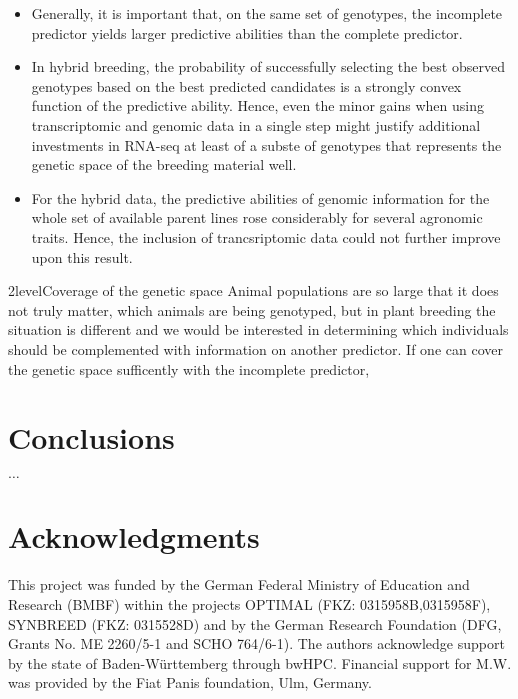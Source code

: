 \documentclass[12pt,titlepage]{article}
\begin{document}
\begin{itemize}
  \item Generally, it is important that, on the same set of genotypes, the 
    incomplete predictor yields larger predictive abilities than the complete 
    predictor.
  \item In hybrid breeding, the probability of successfully selecting the best
    observed genotypes based on the best predicted candidates is a strongly 
    convex function of the predictive ability.
    Hence, even the minor gains when using transcriptomic and genomic data in a
    single step might justify additional investments in RNA-seq at least of a
    subste of genotypes that represents the genetic space of the breeding 
    material well.
  \item For the hybrid data, the predictive abilities of genomic information
    for the whole set of available parent lines rose considerably for several
    agronomic traits.
    Hence, the inclusion of trancsriptomic data could not further improve upon
    this result.
\end{itemize}


\Genetics2level{Coverage of the genetic space}
Animal populations are so large that it does not truly matter, which animals are 
being genotyped, but in plant breeding the situation is different and we would 
be interested in determining which individuals should be complemented with 
information on another predictor.
If one can cover the genetic space sufficently with the incomplete predictor, 





\section*{Conclusions}


$\dots$




\section{Acknowledgments} 
This project was funded by the German Federal Ministry of Education and 
Research (BMBF) within the projects OPTIMAL (FKZ: 0315958B,0315958F),
SYNBREED (FKZ: 0315528D) and by the German Research Foundation 
(DFG, Grants No. ME 2260/5-1 and SCHO 764/6-1).
The authors acknowledge support by the state of Baden-W{\"u}rttemberg through 
bwHPC.
Financial support for M.W. was provided by the Fiat Panis foundation, Ulm,
Germany.



\nolinenumbers


\end{document}
